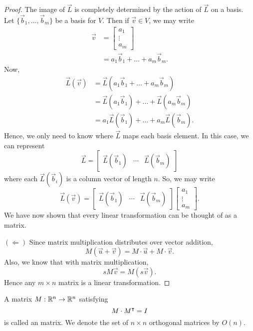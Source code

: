 \documentclass{ximera}
\begin{document}
\begin{lemma}
\begin{proof}
    The image of $\vec{L}$ is completely determined by the action of
    $\vec{L}$ on a basis. Let $\{\vec{b}_1,\dots,\vec{b}_m\}$ be a
    basis for $V$. Then if $\vec{v}\in V$, we may write
    \begin{align*}
      \vec{v} &= \begin{bmatrix}
        a_1\\
        \vdots \\
        a_m
        \end{bmatrix}\\
      &=a_1\vec{b}_1 + \dots + a_m\vec{b}_m.
    \end{align*}
    Now,
    \begin{align*}
      \vec{L}(\vec{v})&=\vec{L}(a_1\vec{b}_1 + \dots + a_m\vec{b}_m)\\
      &= \vec{L}(a_1\vec{b}_1) + \dots + \vec{L}(a_m\vec{b}_m) \\
      &= a_1\vec{L}(\vec{b}_1) + \dots + a_m\vec{L}(\vec{b}_m).
    \end{align*}
    Hence, we only need to know where $\vec{L}$ maps each basis
    element. In this case, we can represent
    \[
    \vec{L} = \begin{bmatrix}
      \vec{L}(\vec{b}_1) & \cdots & \vec{L}(\vec{b}_m)
    \end{bmatrix}
    \]
    where each $\vec{L}(\vec{b}_i)$ is a column vector of length $n$.
    So, we may write
    \[
    \vec{L}(\vec{v}) = \begin{bmatrix}
      \vec{L}(\vec{b}_1) & \cdots & \vec{L}(\vec{b}_m)
    \end{bmatrix} \begin{bmatrix}
        a_1\\
        \vdots \\
        a_m
        \end{bmatrix}.
    \]
    We have now shown that every linear transformation can be thought of as a matrix.

      $(\Leftarrow)$ Since matrix multiplication distributes over
      vector addition,
      \[
      M(\vec{u}+\vec{v})  = M\cdot \vec{u} + M\cdot \vec{v}.
      \]
      Also, we know that with matrix multiplication,
      \[
      s M \vec{v} = M(s\vec{v}).
      \]
      Hence any $m\times n$ matrix is a linear transformation.
  \end{proof}
\end{lemma}



\begin{definition}
  A matrix $M:\mathbb R^n\to \mathbb R^n$ satisfying
  \[
  M\cdot M^\intercal=I
  \]
  is called an  matrix. We denote the set of $n\times
  n$ orthogonal matrices by $O(n)$.
\end{definition}
\end{document}
